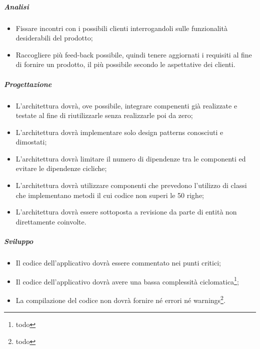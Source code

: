 \subparagraph{Analisi}
\begin{itemize}
\item Fissare incontri con i possibili clienti interrogandoli sulle funzionalit\`{a} desiderabili del prodotto;
\item Raccogliere pi\`{u} feed-back possibile, quindi tenere aggiornati i requisiti al fine di fornire un prodotto, il pi\`{u} possibile secondo le aspettative dei clienti.
\end{itemize}
\subparagraph{Progettazione}
\begin{itemize}
\item L\textquoteright{}architettura dovr\`{a}, ove possibile, integrare compenenti gi\`{a} realizzate e testate al fine di riutilizzarle senza realizzarle poi da zero;
\item L\textquoteright{}architettura dovr\`{a} implementare solo design patterns conosciuti e dimostati;
\item L\textquoteright{}architettura dovr\`{a} limitare il numero di dipendenze tra le componenti ed evitare le dipendenze cicliche;
\item L\textquoteright{}architettura dovr\`{a} utilizzare componenti che prevedono l\textquoteright{}utilizzo di classi che implementano metodi il cui codice non superi le 50 righe;
\item L\textquoteright{}architettura dovr\`{a} essere sottoposta a revisione da parte di entit\`{a} non direttamente coinvolte.
\end{itemize}
\subparagraph{Sviluppo}
\begin{itemize}
\item Il codice dell\textquoteright{}applicativo dovr\`{a} essere commentato nei punti critici;
\item Il codice dell\textquoteright{}applicativo dovr\`{a} avere una bassa complessit\`{a} ciclomatica\footnote{todo};
\item La compilazione del codice non dovr\`{a} fornire né errori né warnings\footnote{todo}.
\end{itemize}